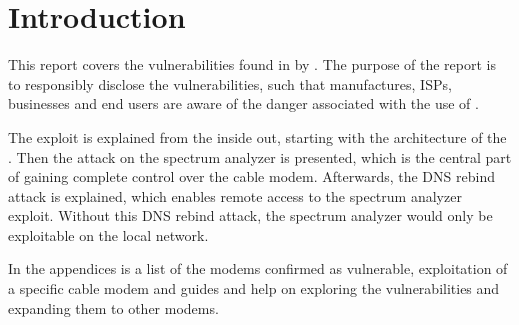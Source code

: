 \chapter{Introduction}

This report covers the \exploitname{} vulnerabilities found in \product{} by \Lyrebirds.
The purpose of the report is to responsibly disclose the vulnerabilities, such that manufactures, ISPs, businesses and end users are aware of the danger associated with the use of \product.

The exploit is explained from the inside out, starting with the architecture of the \product.
Then the attack on the spectrum analyzer is presented, which is the central part of gaining complete control over the cable modem.
Afterwards, the DNS rebind attack is explained, which enables remote access to the spectrum analyzer exploit. 
Without this DNS rebind attack, the spectrum analyzer would only be exploitable on the local network.

In the appendices is a list of the modems confirmed as vulnerable, exploitation of a specific cable modem and guides and help on exploring the vulnerabilities and expanding them to other modems.

